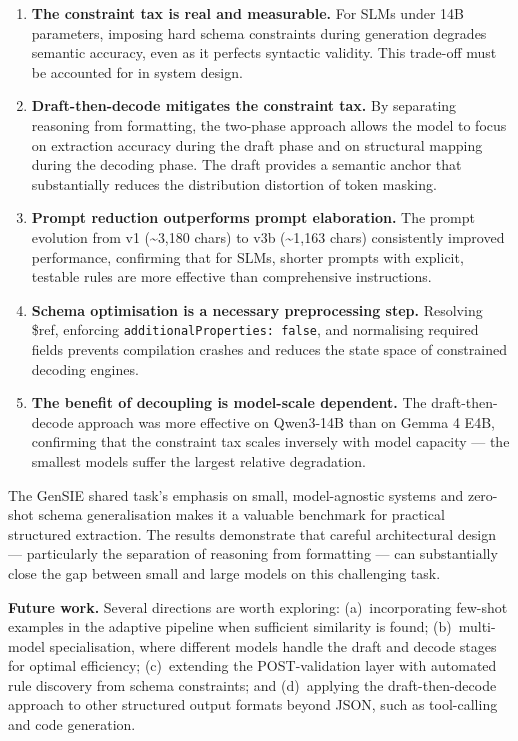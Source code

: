 \documentclass{ceurart}
\begin{document}
\begin{enumerate}
\item \textbf{The constraint tax is real and measurable.}
  For SLMs under 14B parameters, imposing hard schema constraints during generation
  degrades semantic accuracy, even as it perfects syntactic validity.
  This trade-off must be accounted for in system design.

\item \textbf{Draft-then-decode mitigates the constraint tax.}
  By separating reasoning from formatting, the two-phase approach allows the model to
  focus on extraction accuracy during the draft phase and on structural mapping during
  the decoding phase.
  The draft provides a semantic anchor that substantially reduces the distribution
  distortion of token masking.

\item \textbf{Prompt reduction outperforms prompt elaboration.}
  The prompt evolution from v1 ({\textasciitilde}3,180 chars) to v3b
  ({\textasciitilde}1,163 chars) consistently improved performance, confirming that
  for SLMs, shorter prompts with explicit, testable rules are more effective than
  comprehensive instructions.

\item \textbf{Schema optimisation is a necessary preprocessing step.}
  Resolving \$ref, enforcing \texttt{additionalProperties: false}, and normalising
  required fields prevents compilation crashes and reduces the state space of
  constrained decoding engines.

\item \textbf{The benefit of decoupling is model-scale dependent.}
  The draft-then-decode approach was more effective on Qwen3-14B than on
  Gemma 4 E4B, confirming that the constraint tax scales inversely with model
  capacity --- the smallest models suffer the largest relative degradation.
\end{enumerate}

The GenSIE shared task's emphasis on small, model-agnostic systems and zero-shot
schema generalisation makes it a valuable benchmark for practical structured
extraction.
The results demonstrate that careful architectural design --- particularly the
separation of reasoning from formatting --- can substantially close the gap between
small and large models on this challenging task.

\textbf{Future work.}
Several directions are worth exploring:
(a)~incorporating few-shot examples in the adaptive pipeline when sufficient similarity
is found;
(b)~multi-model specialisation, where different models handle the draft and decode
stages for optimal efficiency;
(c)~extending the POST-validation layer with automated rule discovery from schema
constraints; and
(d)~applying the draft-then-decode approach to other structured output formats beyond
JSON, such as tool-calling and code generation.
\end{document}
